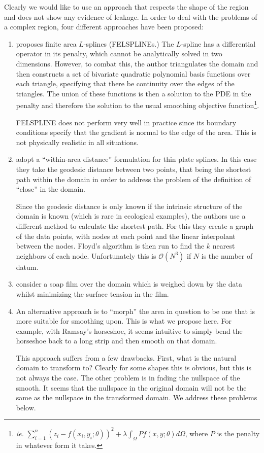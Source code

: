 \documentclass[a4paper,10pt]{amsart}
\begin{document}
Clearly we would like to use an approach that respects the shape of the region and does not show any evidence of leakage. In order to deal with the problems of a complex region, four different approaches have been proposed:

\begin{enumerate}
\item \cite{ramsay} proposes finite area $L$-splines (FELSPLINEs.) The $L$-spline has a differential operator in its penalty, which cannot be analytically solved in two dimensions. However, to combat this, the author triangulates the domain and then constructs a set of bivariate quadratic polynomial basis functions over each triangle, specifying that there be continuity over the edges of the triangles. The union of these functions is then a solution to the PDE in the penalty and therefore the solution to the usual smoothing objective function\footnote{\emph{ie.} $\sum_{i=1}^n (z_i-f(x_i,y_i;\theta))^2 + \lambda \int_\Omega Pf(x,y;\theta)d\Omega$, where $P$  is the penalty in whatever form it takes.}.

FELSPLINE does not perform very well in practice since its boundary conditions specify that the gradient is normal to the edge of the area. This is not physically realistic in all situations.

\item \cite{wangranalli} adopt a ``within-area distance'' formulation for thin plate splines. In this case they take the geodesic distance between two points, that being the shortest path within the domain in order to address the problem of the definition of ``close'' in the domain. 

Since the geodesic distance is only known if the intrinsic structure of the domain is known (which is rare in ecological examples), the authors use a different method to calculate the shortest path. For this they create a graph of the data points, with nodes at each point and the linear interpolant between the nodes. Floyd's algorithm is then run to find the $k$ nearest neighbors of each node. Unfortunately this is $\mathcal{O}(N^3)$ if $N$ is the number of datum.


\item \cite{soap} consider a soap film over the domain which is weighed down by the data whilst minimizing the surface tension in the film.

\item An alternative approach is to ``morph'' the area in question to be one that is more suitable for smoothing upon. This is what we propose here. For example, with Ramsay's horseshoe, it seems intuitive to simply bend the horseshoe back to a long strip and then smooth on that domain.

This approach suffers from a few drawbacks. First, what is the natural domain to transform to? Clearly for some shapes this is obvious, but this is not always the case. The other problem is in fnding the nullspace of the smooth. It seems that the nullspace in the original domain will not be the same as the nullspace in the transformed domain. We address these problems below.


\end{enumerate}
\end{document}
